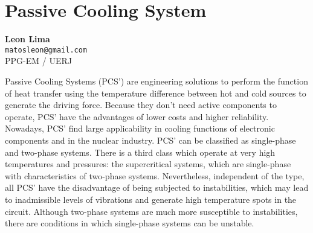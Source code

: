 
\section{Passive Cooling System}

\textbf{Leon Lima}\\
\texttt{\small{matosleon@gmail.com}}\\
PPG-EM / UERJ

Passive Cooling Systems (PCS') are engineering solutions to perform the function of heat transfer using the temperature difference between hot and cold sources to generate the driving force. Because they don't need active components to operate, PCS' have the advantages of lower costs and higher reliability. Nowadays, PCS' find large applicability in cooling functions of electronic components and in the nuclear industry. PCS' can be classified as single-phase and two-phase systems. There is a third class which operate at very high temperatures and pressures: the supercritical systems, which are single-phase with characteristics of two-phase systems. Nevertheless, independent of the type, all PCS' have the disadvantage of being subjected to instabilities, which may lead to inadmissible levels of vibrations and generate high temperature spots in the circuit. Although two-phase systems are much more susceptible to instabilities, there are conditions in which single-phase systems can be unstable.


